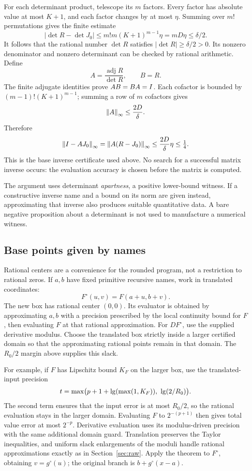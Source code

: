 For each determinant product, telescope its \(m\) factors.
Every factor has absolute value at most \(K+1\), and each
factor changes by at most \(\eta\). Summing over \(m!\)
permutations gives the finite estimate
\[
 |\det R-\det J_0|
 \le m!m(K+1)^{m-1}\eta=mD\eta\le\delta/2.
\]
It follows that the rational number \(\det R\) satisfies
\(|\det R|\ge\delta/2>0\). Its nonzero denominator and nonzero
determinant can be checked by rational arithmetic.
Define
\[
 A=\frac{\operatorname{adj}R}{\det R},\qquad B=R.
\]
The finite adjugate identities prove \(AB=BA=I\).
Each cofactor is bounded by \((m-1)!(K+1)^{m-1}\); summing a row
of \(m\) cofactors gives
\[
 \left\lVert A\right\rVert_\infty\le\frac{2D}{\delta}.
\]
Therefore
\[
 \left\lVert I-AJ_0\right\rVert_\infty
 =\left\lVert A(R-J_0)\right\rVert_\infty
 \le\frac{2D}{\delta}\eta\le\tfrac14.
\]
This is the base inverse certificate used above. No search for
a successful matrix inverse occurs: the evaluation accuracy is
chosen before the matrix is computed.

The argument uses determinant \emph{apartness}, a positive
lower-bound witness. If a constructive inverse name and a bound
on its norm are given instead, approximating that inverse also
produces suitable quantitative data. A bare negative proposition
about a determinant is not used to manufacture a numerical
witness.

\subsection{Base points given by names}

Rational centers are a convenience for the rounded program,
not a restriction to rational zeros. If \(a,b\) have fixed
primitive recursive names, work in translated coordinates:
\[
 F^\circ(u,v)=F(a+u,b+v).
\]
The new box has rational center \((0,0)\).
Its evaluator is obtained by approximating \(a,b\) with a
precision prescribed by the local continuity bound for \(F\),
then evaluating \(F\) at that rational approximation.
For \(D F^\circ\), use the supplied derivative modulus.
Choose the translated box strictly inside a larger certified
domain so that the approximating rational points remain in
that domain. The \(R_0/2\) margin above supplies this slack.

For example, if \(F\) has Lipschitz bound \(K_F\) on the larger
box, use the translated-input precision
\[
 t=\max\bigl(p+1+\lgup(\max(1,K_F)),\ \lgup(2/R_0)\bigr).
\]
The second term ensures that the input error is at most
\(R_0/2\), so the rational evaluation stays in the larger
domain. Evaluating \(F\) to \(2^{-(p+1)}\) then gives total
value error at most \(2^{-p}\).
Derivative evaluation uses its modulus-driven precision
with the same additional domain guard. Translation preserves the Taylor inequalities,
and uniform slack enlargements of the moduli handle rational
approximations exactly as in Section~\ref{sec:raw}.
Apply the theorem to \(F^\circ\), obtaining \(v=g^\circ(u)\);
the original branch is \(b+g^\circ(x-a)\).

